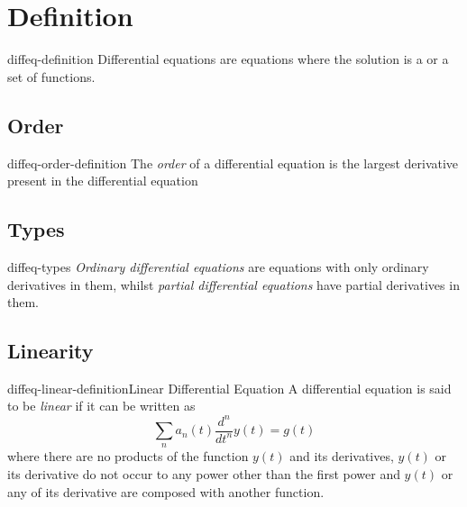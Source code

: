 \documentclass[preview]{standalone}
\begin{document}
\genpage

\section{Definition}

\begin{snippet}{diffeq-definition}
Differential equations are equations where the solution is a \function
or a set of functions.
\end{snippet}

\subsection{Order}

\begin{snippet}{diffeq-order-definition}
    The \textit{order} of a differential equation is the largest derivative present in the
    differential equation
\end{snippet}

\subsection{Types}

\begin{snippet}{diffeq-types}
    \textit{Ordinary differential equations} are equations with only
    ordinary derivatives in them, whilst \textit{partial differential equations}
    have partial derivatives in them.
\end{snippet}

\subsection{Linearity}

\begin{snippetdefinition}{diffeq-linear-definition}{Linear Differential Equation}
    A differential equation is said to be \textit{linear} if it can be written as
    \[
        \sum_n a_n(t) \frac{d^n}{dt^n}y(t)=g(t)
    \]
    where there are no products of the function \(y(t)\) and its derivatives,
    \(y(t)\) or its derivative do not occur to any power other than the first power
    and \(y(t)\) or any of its derivative are composed with another function.
\end{snippetdefinition}
\end{document}
